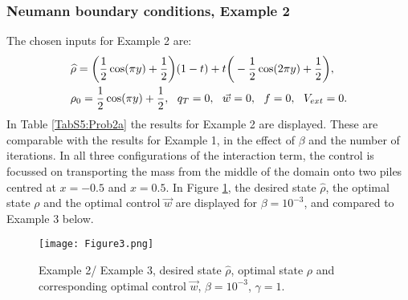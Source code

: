 
\subsubsection{Neumann boundary conditions, Example 2} 
The chosen inputs for Example 2 are:
\begin{align*}
&\widehat \rho = \bigg(\frac{1}{2}\cos(\pi y) + \frac{1}{2}\bigg)(1-t) + t\bigg(-\frac{1}{2}\cos(2 \pi y) + \frac{1}{2}\bigg),\\
&\rho_{0} = \frac{1}{2}\cos(\pi y) + \frac{1}{2},\ \
q_{T} = 0,\ \
\vec{w} = 0,\ \
f =0,\ \
V_{ext} =0.
\end{align*}
In Table \ref{TabS5:Prob2a} the results for Example 2 are displayed. These are comparable with the results for Example 1, in the effect of $\beta$ and the number of iterations. In all three configurations of the interaction term, the control is focussed on transporting the mass from the middle of the domain onto two piles centred at $x=-0.5$ and $x=0.5$. In Figure \ref{Ex22DN1}, the desired state $\widehat \rho$, the optimal state $\rho$ and the optimal control $\vec{w}$ are displayed for $\beta = 10^{-3}$, and compared to Example 3 below. 
\begin{figure}[h]
	\texttt{[image: Figure3.png]}
	\caption{Example 2/ Example 3, desired state $\widehat \rho$, optimal state $\rho$ and corresponding optimal control $\vec{w}$, $\beta = 10^{-3}$, $\gamma = 1$.}
	\label{Ex22DN1}
\end{figure}

